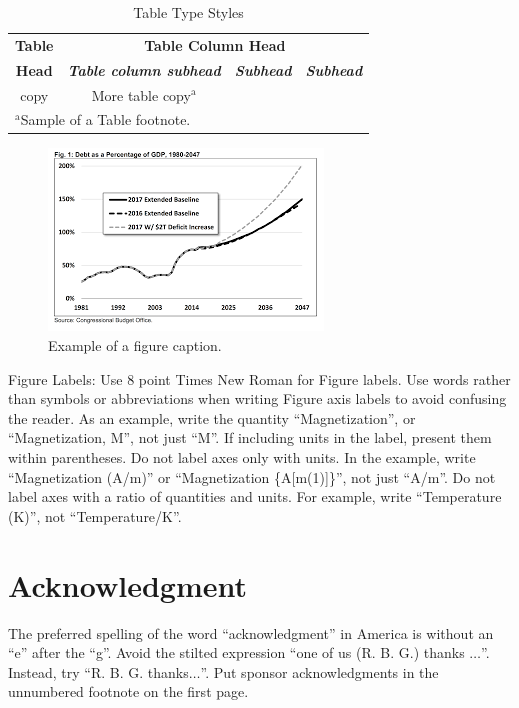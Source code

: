 \documentclass[conference]{IEEEtran}
\begin{document}
\begin{table}[htbp]
\caption{Table Type Styles}
\begin{center}
\begin{tabular}{|c|c|c|c|}
\hline
\textbf{Table}&\multicolumn{3}{|c|}{\textbf{Table Column Head}} \\
\cline{2-4} 
\textbf{Head} & \textbf{\textit{Table column subhead}}& \textbf{\textit{Subhead}}& \textbf{\textit{Subhead}} \\
\hline
copy& More table copy$^{\mathrm{a}}$& &  \\
\hline
\multicolumn{4}{l}{$^{\mathrm{a}}$Sample of a Table footnote.}
\end{tabular}
\label{tab1}
\end{center}
\end{table}

\begin{figure}[htbp]
\centerline{\includegraphics{fig1.png}}
\caption{Example of a figure caption.}
\label{fig}
\end{figure}

Figure Labels: Use 8 point Times New Roman for Figure labels. Use words 
rather than symbols or abbreviations when writing Figure axis labels to 
avoid confusing the reader. As an example, write the quantity 
``Magnetization'', or ``Magnetization, M'', not just ``M''. If including 
units in the label, present them within parentheses. Do not label axes only 
with units. In the example, write ``Magnetization (A/m)'' or ``Magnetization 
\{A[m(1)]\}'', not just ``A/m''. Do not label axes with a ratio of 
quantities and units. For example, write ``Temperature (K)'', not 
``Temperature/K''.

\section*{Acknowledgment}

The preferred spelling of the word ``acknowledgment'' in America is without 
an ``e'' after the ``g''. Avoid the stilted expression ``one of us (R. B. 
G.) thanks $\ldots$''. Instead, try ``R. B. G. thanks$\ldots$''. Put sponsor 
acknowledgments in the unnumbered footnote on the first page.
\end{document}

